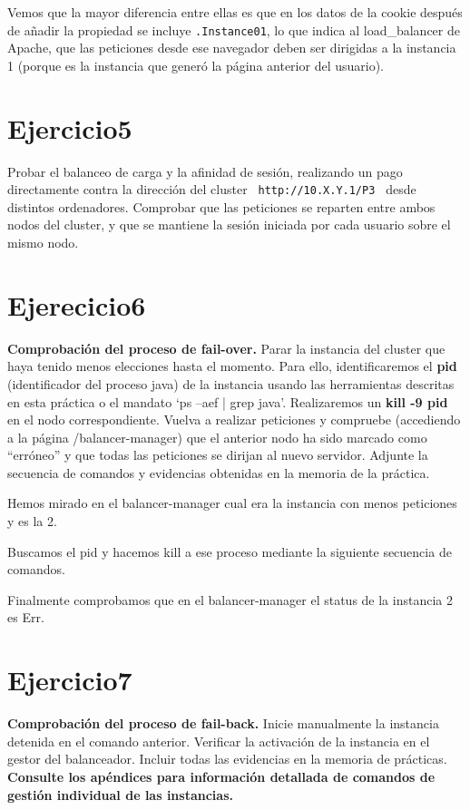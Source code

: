 \documentclass[a4paper, 10pt]{article}
\begin{document}
Vemos que la mayor diferencia entre ellas es que en los datos de la cookie después de añadir la propiedad se incluye \texttt{.Instance01}, lo que indica al load\_balancer de Apache, que las peticiones desde ese navegador deben ser dirigidas a la instancia 1 (porque es la instancia que generó la página anterior del usuario).
\newpage
\section{Ejercicio5}
\begin{mdframed}
	 Probar el balanceo de carga y la afinidad de sesión, realizando un pago directamente contra la dirección del cluster
	 \texttt{ http://10.X.Y.1/P3 }
	 desde distintos ordenadores. Comprobar que las peticiones se reparten entre ambos nodos del cluster, y
	 que se mantiene la sesión iniciada por cada usuario sobre el mismo nodo. 
\end{mdframed}

\section{Ejerecicio6}
\begin{mdframed}
	\textbf{Comprobación del proceso de fail-over.} Parar la instancia del cluster que haya tenido
	menos elecciones hasta el momento. Para ello, identificaremos el \textbf{pid} (identificador del proceso java) de la
	instancia usando las herramientas descritas en esta práctica o el mandato ‘ps –aef | grep java’.
	Realizaremos un \textbf{kill -9 pid} en el nodo correspondiente. Vuelva a realizar peticiones y compruebe
	(accediendo a la página /balancer-manager) que el anterior nodo ha sido marcado como “erróneo” y que
	todas las peticiones se dirijan al nuevo servidor. Adjunte la secuencia de comandos y evidencias obtenidas
	en la memoria de la práctica. 
\end{mdframed}

Hemos mirado en el balancer-manager cual era la instancia con menos peticiones y es la 2.

Buscamos el pid y hacemos kill a ese proceso mediante la siguiente secuencia de comandos.

Finalmente comprobamos que en el balancer-manager el status de la instancia 2 es Err.
\section{Ejercicio7}
\begin{mdframed}
	 \textbf{Comprobación del proceso de fail-back.} Inicie manualmente la instancia detenida en el
	 comando anterior. Verificar la activación de la instancia en el gestor del balanceador. Incluir todas las
	 evidencias en la memoria de prácticas. \textbf{Consulte los apéndices para información detallada de
	 comandos de gestión individual de las instancias.}
\end{mdframed}
\end{document}
